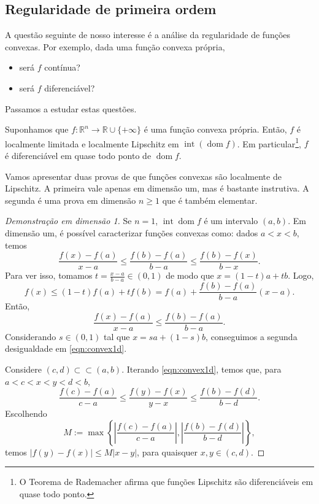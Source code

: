 \subsection{Regularidade de primeira ordem}

A questão seguinte de nosso interesse é a análise da regularidade de funções convexas. Por exemplo, dada uma função convexa própria,
\begin{itemize}
	\item será $f$ contínua?
	\item será $f$ diferenciável?
\end{itemize} Passamos a estudar estas questões.

\begin{teo}\label{thm:convex-loclip}
	Suponhamos que $f: \mathbb{R}^n \to \mathbb{R}\cup \{+ \infty\}$ é uma função convexa própria. Então, $f$ é localmente limitada e localmente Lipschitz em $\operatorname{int} (\operatorname{dom} f)$. Em particular\footnote{O Teorema de Rademacher afirma que funções Lipschitz são diferenciáveis em quase todo ponto.}, $f$ é diferenciável em quase todo ponto de $\operatorname{dom} f$.
\end{teo}

Vamos apresentar duas provas de que funções convexas são localmente de Lipschitz. A primeira vale apenas em dimensão um, mas é bastante instrutiva. A segunda é uma prova em dimensão $n \ge 1$ que é também elementar.

\begin{proof}[Demonstração em dimensão 1]
	Se $n=1$, $\operatorname{int} \operatorname{dom} f$ é um intervalo $(a,b)$. Em dimensão um, é possível caracterizar funções convexas como: dados $a < x < b$, temos
	\begin{equation}\label{eqn:convex1d}
	\frac{f(x) - f(a)}{x-a} \le \frac{f(b) - f(a)}{b-a} \le \frac{f(b) - f(x)}{b-x}.
	\end{equation} Para ver isso, tomamos $t = \frac{x-a}{b-a} \in (0,1)$ de modo que $x = (1-t)a + t b$. Logo,
	\[
	f(x) \le (1- t) f(a) + t f(b) = f(a) + \frac{f(b) - f(a)}{b - a} (x-a).
	\] Então,
	\[
	\frac{f(x) - f(a)}{x-a} \le \frac{f(b)-f(a)}{b-a}.
	\] Considerando $s \in (0,1)$ tal que $x = sa + (1-s) b$, conseguimos a segunda desigualdade em \eqref{eqn:convex1d}.
	
	Considere $(c,d) \subset\subset (a,b)$. Iterando \eqref{eqn:convex1d}, temos que, para $a < c < x < y < d < b$,
	\[
	\frac{f(c) - f(a)}{c-a} \le \frac{f(y) - f(x)}{y-x} \le \frac{f(b) - f(d)}{b-d}.
	\] Escolhendo 
	\[
	M := \max \left\{ \left| \frac{f(c) - f(a)}{c-a} \right|, \left| \frac{f(b) - f(d)}{b-d} \right| \right\},
	\] temos $\big|f(y) - f(x)\big| \le M |x-y|$, para quaisquer $x,y \in (c,d).$
\end{proof}

